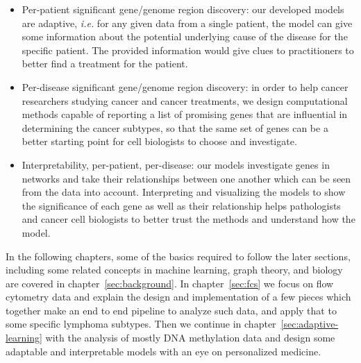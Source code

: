 \begin{itemize}
  \item Per-patient significant gene/genome region discovery: our developed
    models are adaptive, \emph{i.e.} for any given data from a single patient,
    the model can give some information about the potential underlying cause of
    the disease for the specific patient. The provided information would give
    clues to practitioners to better find a treatment for the patient.
  \item Per-disease significant gene/genome region discovery: in order to help
    cancer researchers studying cancer and cancer treatments, we design
    computational methods capable of reporting a list of promising genes that
    are influential in determining the cancer subtypes, so that the same set of
    genes can be a better starting point for cell biologists to choose and
    investigate.
  \item Interpretability, per-patient, per-disease: our models investigate
    genes in networks and take their relationships between one another which
    can be seen from the data into account. Interpreting and visualizing the
    models to show the significance of each gene as well as their relationship
    helps pathologists and cancer cell biologists to better trust the methods
    and understand how the model.
\end{itemize}

In the following chapters, some of the basics required to follow the later
sections, including some related concepts in machine learning, graph theory,
and biology are covered in chapter~\ref{sec:background}. In
chapter~\ref{sec:fcs} we focus on flow cytometry data and explain the design
and implementation of a few pieces which together make an end to end pipeline
to analyze such data, and apply that to some specific lymphoma subtypes. Then
we continue in chapter~\ref{sec:adaptive-learning} with the analysis of mostly
DNA methylation data and design some adaptable and interpretable models with an
eye on personalized medicine.

